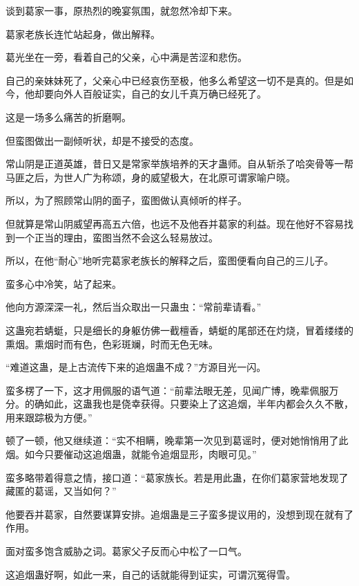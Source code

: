 
\begin{this_body}



谈到葛家一事，原热烈的晚宴氛围，就忽然冷却下来。

葛家老族长连忙站起身，做出解释。

葛光坐在一旁，看着自己的父亲，心中满是苦涩和悲伤。

自己的亲妹妹死了，父亲心中已经哀伤至极，他多么希望这一切不是真的。但是如今，他却要向外人百般证实，自己的女儿千真万确已经死了。

这是一场多么痛苦的折磨啊。

但蛮图做出一副倾听状，却是不接受的态度。

常山阴是正道英雄，昔日又是常家举族培养的天才蛊师。自从斩杀了哈突骨等一帮马匪之后，为世人广为称颂，身的威望极大，在北原可谓家喻户晓。

所以，为了照顾常山阴的面子，蛮图做认真倾听的样子。

但就算是常山阴威望再高五六倍，也远不及他吞并葛家的利益。现在他好不容易找到一个正当的理由，蛮图当然不会这么轻易放过。

所以，在他“耐心”地听完葛家老族长的解释之后，蛮图便看向自己的三儿子。

蛮多心中冷笑，站了起来。

他向方源深深一礼，然后当众取出一只蛊虫：“常前辈请看。”

这蛊宛若蜻蜓，只是细长的身躯仿佛一截檀香，蜻蜓的尾部还在灼烧，冒着缕缕的熏烟。熏烟时而有色，色彩斑斓，时而无色无味。

“难道这蛊，是上古流传下来的追烟蛊不成？”方源目光一闪。

蛮多楞了一下，这才用佩服的语气道：“前辈法眼无差，见闻广博，晚辈佩服万分。的确如此，这蛊我也是侥幸获得。只要染上了这追烟，半年内都会久久不散，用来跟踪极为方便。”

顿了一顿，他又继续道：“实不相瞒，晚辈第一次见到葛谣时，便对她悄悄用了此烟。如今只要催动这追烟蛊，就能令追烟显形，肉眼可见。”

蛮多略带着得意之情，接口道：“葛家族长。若是用此蛊，在你们葛家营地发现了藏匿的葛谣，又当如何？”

他要吞并葛家，自然要谋算安排。追烟蛊是三子蛮多提议用的，没想到现在就有了作用。

面对蛮多饱含威胁之词。葛家父子反而心中松了一口气。

这追烟蛊好啊，如此一来，自己的话就能得到证实，可谓沉冤得雪。


\end{this_body}

